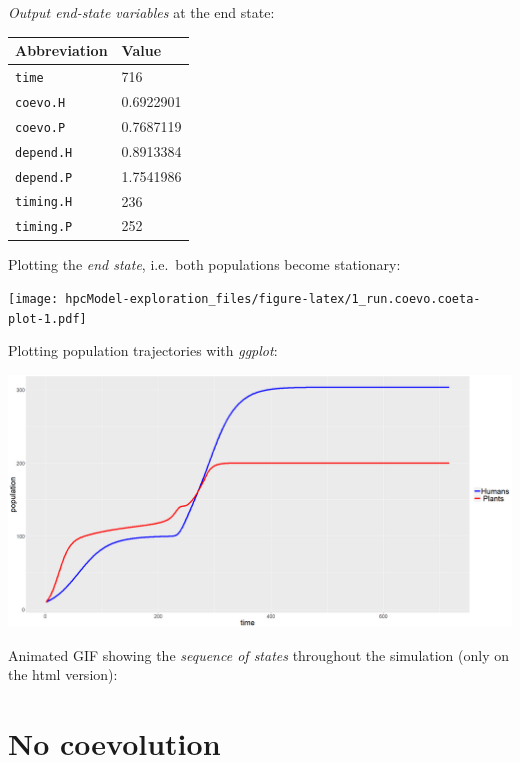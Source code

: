 \documentclass[]{book}
\begin{document}
\vspace{1cm}

\emph{Output end-state variables} at the end state:

\begin{longtable}[]{@{}ll@{}}
\toprule
Abbreviation & Value\tabularnewline
\midrule
\endhead
\texttt{time} & 716\tabularnewline
\texttt{coevo.H} & 0.6922901\tabularnewline
\texttt{coevo.P} & 0.7687119\tabularnewline
\texttt{depend.H} & 0.8913384\tabularnewline
\texttt{depend.P} & 1.7541986\tabularnewline
\texttt{timing.H} & 236\tabularnewline
\texttt{timing.P} & 252\tabularnewline
\bottomrule
\end{longtable}

\newpage

Plotting the \emph{end state}, i.e.~both populations become stationary:

\texttt{[image: hpcModel-exploration\_files/figure-latex/1\_run.coevo.coeta-plot-1.pdf]}

\newpage

Plotting population trajectories with \emph{ggplot}:

\includegraphics[width=1\linewidth]{plots/1_singleRun-ggplot-coevo.coeta}

\newpage

Animated GIF showing the \emph{sequence of states} throughout the simulation (only on the html version):

\newpage

\hypertarget{no-coevolution}{%
\section{No coevolution}\label{no-coevolution}}
\end{document}

